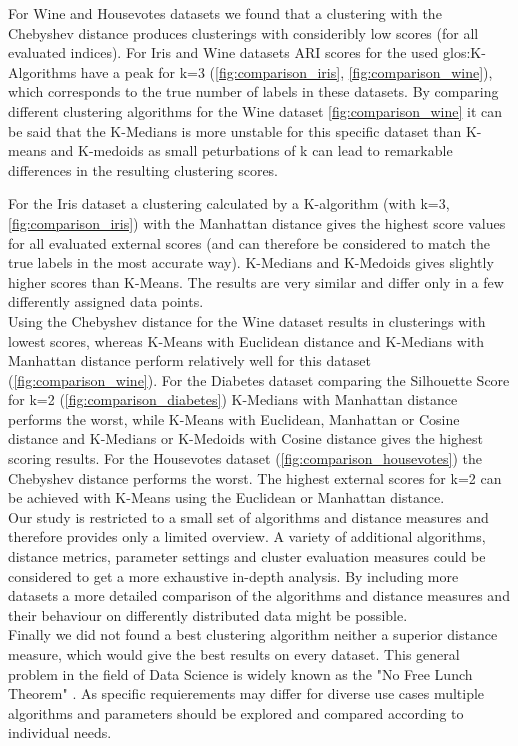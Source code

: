 
For Wine and Housevotes datasets we found that a clustering with the Chebyshev distance produces clusterings with consideribly low scores (for all evaluated indices). 
For Iris and Wine datasets ARI scores for the used \Gls{glos:K-Algorithms} have a peak for k=3 (\autoref{fig:comparison_iris}, \autoref{fig:comparison_wine}), which corresponds to the true number of labels in these datasets.  
By comparing different clustering algorithms for the Wine dataset \autoref{fig:comparison_wine} it can be said that the K-Medians is more unstable for this specific dataset than K-means and K-medoids as small peturbations of k can lead to remarkable differences in the resulting clustering scores. 


For the Iris dataset a clustering calculated by a K-algorithm (with k=3, \autoref{fig:comparison_iris})  with the Manhattan distance gives the highest score values for all evaluated external scores (and can therefore be considered to match the true labels in the most accurate way). K-Medians and K-Medoids gives slightly higher scores than K-Means. The results are very similar and differ only in a few differently assigned data points. \\
Using the Chebyshev distance for the Wine dataset results in clusterings with lowest scores, whereas K-Means with Euclidean distance and K-Medians with Manhattan distance perform relatively well for this dataset (\autoref{fig:comparison_wine}).  
For the Diabetes dataset comparing the Silhouette Score for k=2 (\autoref{fig:comparison_diabetes}) K-Medians with Manhattan distance performs the worst, while K-Means with Euclidean, Manhattan or Cosine distance and K-Medians or K-Medoids with Cosine distance gives the highest scoring results. 
For the Housevotes dataset (\autoref{fig:comparison_housevotes}) the Chebyshev distance performs the worst. The highest external scores for k=2 can be achieved with K-Means using the Euclidean or Manhattan distance. \\

Our study is restricted to a small set of algorithms and distance measures and therefore provides only a limited overview. A variety of additional algorithms, distance metrics, parameter settings and cluster evaluation measures could be considered to get a more exhaustive in-depth analysis. By including more datasets a more detailed comparison of the algorithms and distance measures and their behaviour on differently distributed data might be possible. \\

Finally we did not found a best clustering algorithm neither a superior distance measure, which would give the best results on every dataset. This general problem in the field of Data Science is widely known as the "No Free Lunch Theorem" \cite{nofreelunch}. As specific requierements may differ for diverse use cases multiple algorithms and parameters should be explored and compared according to individual needs. 